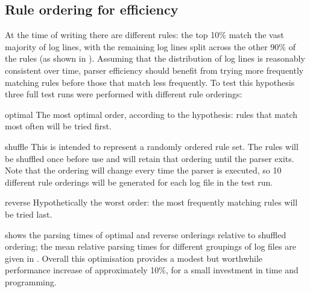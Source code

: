 \subsection{Rule ordering for efficiency}

\label{rule ordering for efficiency}

At the time of writing there are \numberOFrules{} different rules: the top
10\% match the vast majority of log lines, with the remaining log lines
split across the other 90\% of the rules (as shown in ).  Assuming that the distribution of log lines is reasonably
consistent over time, parser efficiency should benefit from trying more
frequently matching rules before those that match less frequently.  To
test this hypothesis three full test runs were performed with different
rule orderings:

\begin{eqlist}

    \item [optimal]  The most optimal order, according to the hypothesis:
        rules that match most often will be tried first.

    \item [shuffle] This is intended to represent a randomly ordered rule
        set.  The rules will be shuffled once before use and will retain
        that ordering until the parser exits.  Note that the ordering will
        change every time the parser is executed, so 10 different rule
        orderings will be generated for each log file in the test run.  

    \item [reverse] Hypothetically the worst order: the most frequently
        matching rules will be tried last.

\end{eqlist}

 shows the
parsing times of optimal and reverse orderings relative to shuffled
ordering; the mean relative parsing times for different groupings of log
files are given in .  Overall this optimisation provides a modest but worthwhile
performance increase of approximately 10\%, for a small investment in time
and programming.


